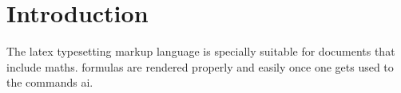 
\section{Introduction}

The \Gls{latex} typesetting markup language is specially suitable 
for documents that include \gls{maths}. \Glspl{formula} are rendered 
properly and easily once one gets used to the commands \gls{ai}.\cite{billen_kundenbindung_2005}
